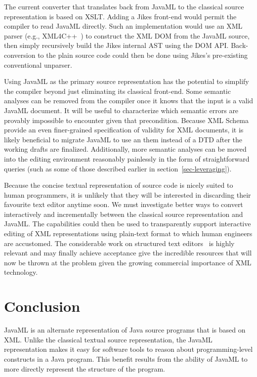 \documentclass{article}
\begin{document}
\begin{multicols}{2}
The current converter that translates back from JavaML to the classical
source representation is based on XSLT.  Adding a
Jikes front-end would permit the compiler to read JavaML directly.
Such an implementation would use an XML parser (e.g.,
XML4C++~\cite{XML4C++}) to construct the XML DOM from the JavaML source,
then simply recursively build the Jikes internal AST using the DOM API.
Back-conversion to the plain source code could then be done using
Jikes's pre-existing conventional unparser.

Using JavaML as the primary source representation has the potential to
simplify the compiler beyond just eliminating its classical front-end.
Some semantic analyses can be removed from the compiler once it knows
that the input is a valid JavaML document.  It will be useful to
characterize which semantic errors are provably impossible to encounter
given that precondition.  Because XML
Schema~\cite{XMLSchema1,XMLSchema2} provide an even finer-grained
specification of validity for XML documents, it is likely beneficial to
migrate JavaML to use an them instead of a DTD after the working drafts
are finalized.  Additionally, more semantic analyses can be moved into
the editing environment reasonably painlessly in the form of
straightforward queries (such as some of those described earlier in
section~\ref{sec-leveraging}).

Because the concise textual representation of source code is nicely
suited to human programmers, it is unlikely that they will be interested
in discarding their favourite text editor anytime soon.  We must
investigate better ways to convert interactively and incrementally
between the classical source representation and JavaML.  The
capabilities could then be used to transparently support interactive
editing of XML representations using plain-text format to which human
engineers are accustomed.  The considerable work on structured text
editors~\cite{Habermann86,Miller99} is highly relevant and may finally
achieve acceptance give the incredible resources that will now be thrown
at the problem given the growing commercial importance of XML
technology.

\section{Conclusion}
\label{sec-conclusion}

JavaML is an alternate representation of Java source programs that is
based on XML.  Unlike the classical textual source representation, the
JavaML representation makes it easy for software tools to reason about
programming-level constructs in a Java program.  This benefit results from the
ability of JavaML to more directly represent the structure of the program.


\end{multicols}
\end{document}
